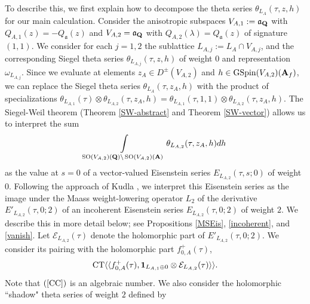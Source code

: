 \documentclass{amsart}
\theoremstyle{definition}
\begin{document}
To describe this, we first explain how to decompose the theta series $\theta_{L_{A}}(\tau, z, h)$ for our main calculation.
Consider the anisotropic subspaces $V_{A, 1} := \mathfrak{a}_{\bf{Q}}$ with $Q_{A, 1}(z) = - Q_{\mathfrak{a}}(z)$ 
and $V_{A, 2} = \mathfrak{a}_{\bf{Q}}$ with $Q_{A, 2}(\lambda) = Q_{\mathfrak{a}}(z)$ of signature $(1,1)$.
We consider for each $j = 1,2$ the sublattice $L_{A,j} := L_A \cap V_{A, j}$, and the corresponding Siegel theta series 
$\theta_{L_{A,j}}(\tau, z, h)$ of weight $0$ and representation $\omega_{L_{A,j}}$. 
Since we evaluate at elements $z_A \in D^{\pm}(V_{A,2})$ and $h \in \operatorname{GSpin}(V_{A, 2})({\bf{A}}_f)$, 
we can replace the Siegel theta series $\theta_{L_A}(\tau, z_A, h)$ with the product of specializations 
$\theta_{L_{A,1}}(\tau) \otimes \theta_{L_{A,2}}(\tau, z_A, h) = \theta_{L_{A,1}}(\tau, 1, 1) \otimes \theta_{L_{A,2}}(\tau, z_A, h)$.
The Siegel-Weil theorem (Theorem \ref{SW-abstract} and Theorem \ref{SW-vector}) allows us to interpret  the sum
\begin{align*} \int\limits_{ \operatorname{SO} (V_{A, 2})({\bf{Q}}) \backslash \operatorname{SO}(V_{A, 2})({\bf{A}})  } \theta_{L_{A,2}}(\tau, z_A, h) dh \end{align*} 
as the value at $s=0$ of a vector-valued Eisenstein series $E_{L_{A,2}}(\tau, s; 0)$ of weight $0$. 
Following the approach of Kudla \cite{KuBL}, we interpret this Eisenstein series as the image 
under the Maass weight-lowering operator $L_2$ of the derivative $E'_{L_{A,2}}(\tau, 0; 2)$ of an incoherent Eisenstein series $E_{L_{A,2}}(\tau, 0; 2)$ of weight $2$. 
We describe this in more detail below; see Propositions \ref{MSEis}, \ref{incoherent}, and \ref{vanish}.
Let $\mathcal{E}_{L_{A,2}}(\tau)$ denote the holomorphic part of $E'_{L_{A,2}}(\tau, 0; 2)$. 
We consider its pairing with the holomorphic part $f_{0,A}^+(\tau)$, 
\begin{equation}\begin{aligned}\label{CC} \operatorname{CT}  \langle\langle f_{0, A}^+(\tau), {\bf{1}}_{L_{A,1} \oplus 0} \otimes \mathcal{E}_{L_{A,2}}(\tau) \rangle \rangle.
\end{aligned}\end{equation} Note that $(\ref{CC})$ is an algebraic number. 
We also consider the holomorphic ``shadow" theta series of weight $2$ defined by 
\end{document}
